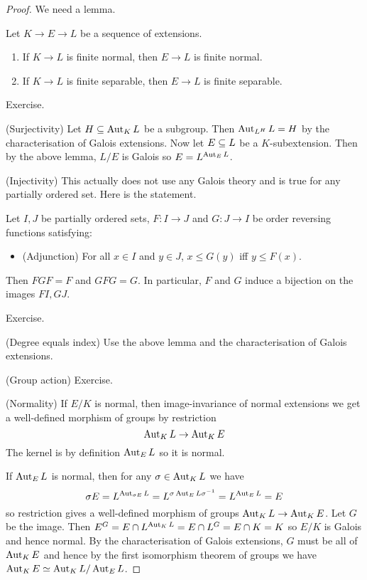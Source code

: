 \documentclass{article}
\begin{document}
\begin{proof}
  We need a lemma. 
  \begin{lem}
    Let $K \to E \to L$ be a sequence of extensions.
    \begin{enumerate}
      \item If $K \to L$ is finite normal, then $E \to L$ is finite normal.
      \item If $K \to L$ is finite separable, 
      then $E \to L$ is finite separable.
    \end{enumerate}
    \begin{proof1}
      Exercise.
    \end{proof1}
  \end{lem}
  (Surjectivity) 
  Let $H \subseteq \operatorname{Aut}_K L$ be a subgroup.
  Then $\operatorname{Aut}_{L^H} L = H$ by the characterisation of Galois extensions.
  Now let $E \subseteq L$ be a $K$-subextension.
  Then by the above lemma, $L/E$ is Galois so $E = L^{\operatorname{Aut}_E L}$.

  (Injectivity) This actually does not use any Galois theory
  and is true for any partially ordered set.
  Here is the statement.
  \begin{lem}
    Let $I, J$ be partially ordered sets,
    $F : I \to J$ and $G : J \to I$ be order reversing functions
    satisfying: 
    \begin{itemize}
      \item (Adjunction) For all $x \in I$ and $y \in J$,
      $x \leq G(y)$ iff $y \leq F(x)$.
    \end{itemize}
    Then $FGF = F$ and $GFG = G$.
    In particular, $F$ and $G$ induce a bijection on
    the images $FI, GJ$.
    \begin{proof1}
      Exercise.
    \end{proof1}
  \end{lem}
  (Degree equals index) Use the above lemma and 
  the characterisation of Galois extensions.
  
  (Group action) Exercise.

  (Normality)
  If $E / K$ is normal,
  then image-invariance of normal extensions we get a
  well-defined morphism of groups by restriction \[
    \operatorname{Aut}_K L \to \operatorname{Aut}_K E
  \]
  The kernel is by definition $\operatorname{Aut}_E L$ so it is normal.

  If $\operatorname{Aut}_E L$ is normal,
  then for any $\sigma \in \operatorname{Aut}_K L$ we have 
  \[
    \sigma E = L^{\operatorname{Aut}_{\sigma E} L}
    = L^{\sigma \operatorname{Aut}_E L \sigma^{-1}}
    = L^{\operatorname{Aut}_E L} = E
  \]
  so restriction gives a well-defined morphism of groups
  $\operatorname{Aut}_K L \to \operatorname{Aut}_K E$.
  Let $G$ be the image.
  Then $E^G = E \cap L^{\operatorname{Aut}_K L} = E \cap L^G = E \cap K = K$
  so $E / K$ is Galois and hence normal.
  By the characterisation of Galois extensions,
  $G$ must be all of $\operatorname{Aut}_K E$ and hence 
  by the first isomorphism theorem of groups 
  we have $\operatorname{Aut}_K E \simeq \operatorname{Aut}_K L / \operatorname{Aut}_E L$.

\end{proof}
\end{document}
